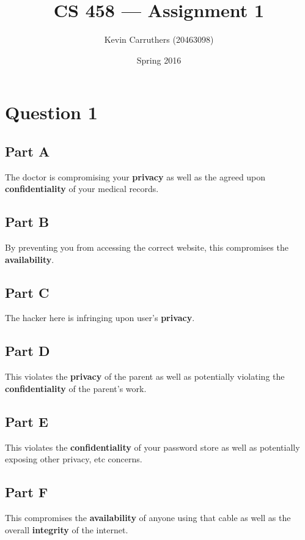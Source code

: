\documentclass[12pt]{article}
\begin{document}
\title{CS 458 --- Assignment 1}
\author{Kevin Carruthers (20463098)}
\date{\vspace{-2ex}Spring 2016}
\maketitle\HRule

\section*{Question 1}
\subsection*{Part A}
The doctor is compromising your {\bf privacy} as well as the agreed upon {\bf confidentiality} of your medical records.

\subsection*{Part B}
By preventing you from accessing the correct website, this compromises the {\bf availability}.

\subsection*{Part C}
The hacker here is infringing upon user's {\bf privacy}.

\subsection*{Part D}
This violates the {\bf privacy} of the parent as well as potentially violating the {\bf confidentiality} of the parent's work.

\subsection*{Part E}
This violates the {\bf confidentiality} of your password store as well as potentially exposing other privacy, etc concerns.

\subsection*{Part F}
This compromises the {\bf availability} of anyone using that cable as well as the overall {\bf integrity} of the internet.
\end{document}
